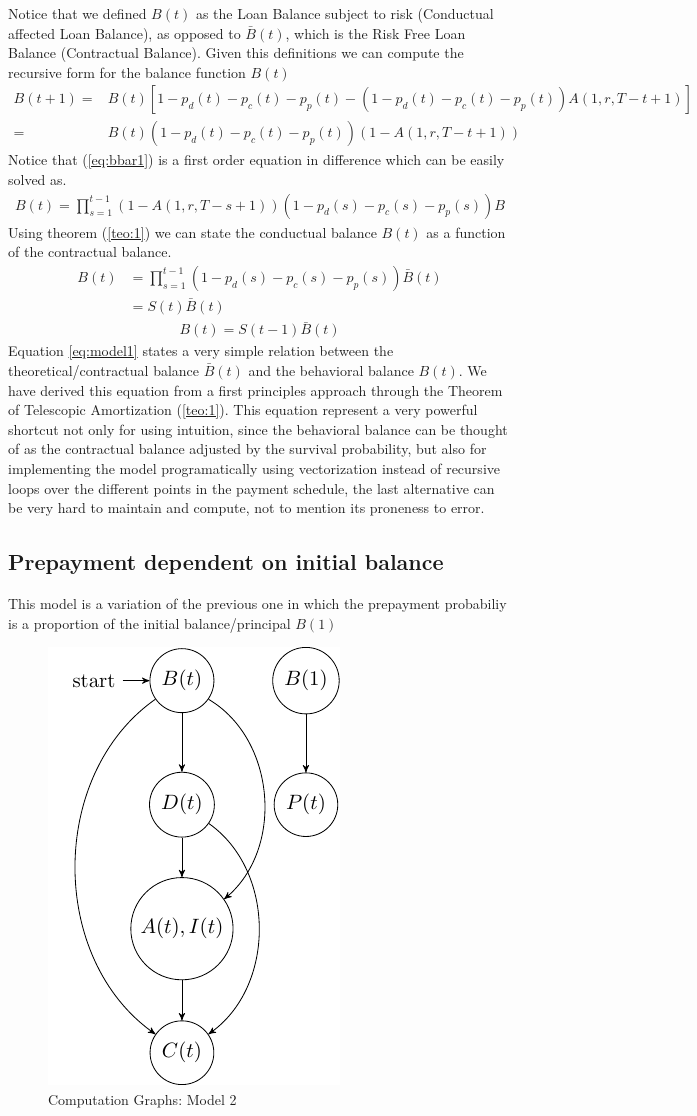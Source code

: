 Notice that we defined $B(t)$ as the Loan Balance subject to risk (Conductual affected Loan Balance), as opposed to $\bar{B}(t)$, which is the Risk Free Loan Balance (Contractual Balance).  Given this definitions we can compute the recursive form for the balance function $B(t)$
\begin{align}
B(t+1) =& B(t)[1-p_d(t)-p_c(t)-p_p(t)-(1-p_d(t)-p_c(t)-p_p(t))A(1,r,T-t+1) ] \nonumber\\
     =&
    B(t)(1-p_d(t)-p_c(t)-p_p(t))(1-A(1,r,T-t+1)) \label{eq:bbar1}\
\end{align}
Notice that (\ref{eq:bbar1}) is a first order equation in difference which can be easily solved as.
\begin{align}
    B(t) =\prod^{t-1}_{s=1} (1-A(1,r,T-s+1))(1-p_d(s)-p_c(s)-p_p(s))B
\end{align}
Using theorem (\ref{teo:1}) we can state the conductual balance $B(t)$ as a function of the contractual balance.
\begin{align}
    B(t) &=\prod^{t-1}_{s=1} (1-p_d(s)-p_c(s)-p_p(s))\bar{B}(t) \nonumber\\
    &=S(t)\bar{B}(t) \nonumber
\end{align}
\begin{align}
    \boxed{B(t)=S(t-1)\bar{B}(t) } \label{eq:model1}
\end{align}
Equation \ref{eq:model1} states a very simple relation between the theoretical/contractual balance $\bar{B}(t)$ and the behavioral balance $B(t)$. We have derived this equation from a first principles approach through the Theorem of Telescopic Amortization (\ref{teo:1}). This equation represent a very powerful shortcut not only for using intuition, since the behavioral balance can be thought of as the contractual balance adjusted by the survival probability, but also for implementing the model programatically using vectorization instead of recursive loops over the different points in the payment schedule, the last alternative can be very hard to maintain and compute, not to mention its proneness to error.

\subsection{Prepayment dependent on initial balance}
This model is a variation of the previous one in which the prepayment probabiliy is a proportion of the initial balance/principal $B(1)$
\begin{figure}[H]
  \centering
      \includegraphics[width=.3\textwidth]{Graph1.pdf} 
 \caption{Computation Graphs: Model 2}
 \label{fig:Test}
\end{figure}

